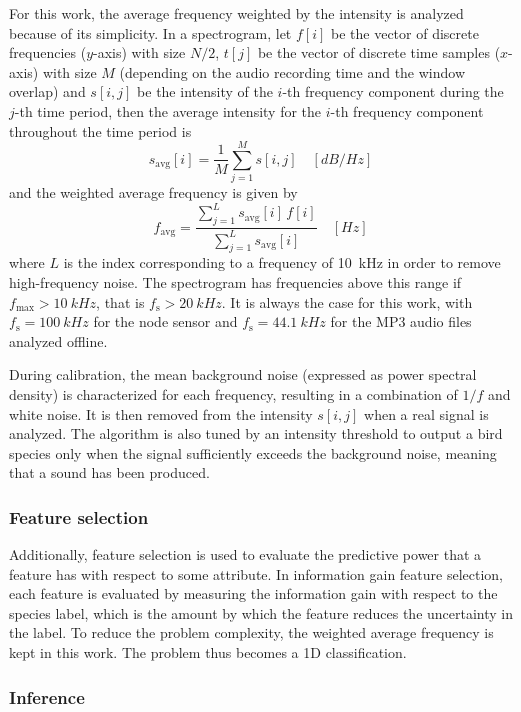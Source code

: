 \documentclass{EPL-master-thesis-covers-EN}
\newcommand{\te}[1]{\textrm{#1}}
\begin{document}
For this work, the average frequency weighted by the intensity is analyzed because of its simplicity. In a spectrogram, let $f[i]$ be the vector of discrete frequencies ($y$-axis) with size $N/2$, $t[j]$ be the vector of discrete time samples ($x$-axis) with size $M$ (depending on the audio recording time and the window overlap) and $s[i,j]$ be the intensity of the $i$-th frequency component during the $j$-th time period, then the average intensity for the $i$-th frequency component throughout the time period is
\[
 s_\te{avg}[i] = \frac{1}{M} \sum_{j=1}^{M} s[i,j] \quad [\si{dB/Hz}]
\]
and the weighted average frequency is given by
\[
 f_\te{avg} = \frac{\sum_{j=1}^{L} s_\te{avg}[i] \, f[i]}{\sum_{j=1}^{L} s_\te{avg}[i]} \quad [\si{Hz}]
\]
where $L$ is the index corresponding to a frequency of \SI{10}{kHz} in order to remove high-frequency noise. The spectrogram has frequencies above this range if $f_\te{max} > \SI{10}{kHz}$, that is $f_\te{s} > \SI{20}{kHz}$. It is always the case for this work, with $f_\te{s} = \SI{100}{kHz}$ for the node sensor and $f_\te{s} = \SI{44.1}{kHz}$ for the MP3 audio files analyzed offline.

During calibration, the mean background noise (expressed as power spectral density) is characterized for each frequency, resulting in a combination of $1/f$ and white noise. It is then removed from the intensity $s[i,j]$ when a real signal is analyzed. The algorithm is also tuned by an intensity threshold to output a bird species only when the signal sufficiently exceeds the background noise, meaning that a sound has been produced.

\subsubsection*{Feature selection}

Additionally, feature selection is used to evaluate the predictive power that a feature has with respect to some attribute.
In information gain feature selection, each feature is evaluated by measuring the information gain with respect to the species label, which is the amount by which the feature reduces the uncertainty in the label. To reduce the problem complexity, the weighted average frequency is kept in this work. The problem thus becomes a 1D classification.

\subsubsection*{Inference}
\end{document}
